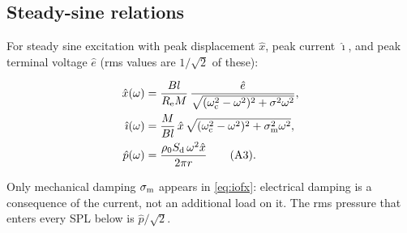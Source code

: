 \subsection{Steady-sine relations}
\label{sec:model-steady}

For steady sine excitation with peak displacement $\hat x$, peak current
$\hat\imath$, and peak terminal voltage $\hat e$ (rms values are
$1/\sqrt2$ of these):

\begin{align}
	\hat{x}(\omega)&=
		\frac{Bl}{R_{\mathrm{e}}M}\,
		\frac{\hat{e}}{\sqrt{(\omega_{\mathrm{c}}^2-\omega^2)^2+\sigma^2\omega^2}},
		\label{eq:xofe}\\
	\hat{\imath}(\omega)&=
		\frac{M}{Bl}\,
		\hat{x}\,\sqrt{(\omega_{\mathrm{c}}^2-\omega^2)^2+\sigma_{\mathrm{m}}^2\omega^2},
		\label{eq:iofx}\\
	\hat{p}(\omega)&=
		\frac{\rho_0S_{\mathrm{d}}\,\omega^2\hat{x}}{2\pi r}\qquad\text{(A3)} .
		\label{eq:pofx}
\end{align}

Only mechanical damping $\sigma_{\mathrm{m}}$ appears in \cref{eq:iofx}: electrical damping
is a consequence of the current, not an additional load on it. The rms
pressure that enters every SPL below is $\hat p/\sqrt2$.
